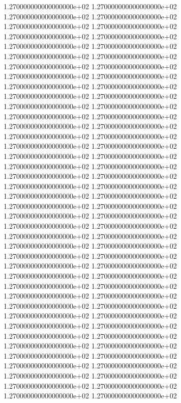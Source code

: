 1.270000000000000000e+02 1.270000000000000000e+02 1.270000000000000000e+02 1.270000000000000000e+02 1.270000000000000000e+02 1.270000000000000000e+02 1.270000000000000000e+02 1.270000000000000000e+02 1.270000000000000000e+02 1.270000000000000000e+02 1.270000000000000000e+02 1.270000000000000000e+02 1.270000000000000000e+02 1.270000000000000000e+02 1.270000000000000000e+02 1.270000000000000000e+02 1.270000000000000000e+02 1.270000000000000000e+02 1.270000000000000000e+02 1.270000000000000000e+02 1.270000000000000000e+02 1.270000000000000000e+02 1.270000000000000000e+02 1.270000000000000000e+02 1.270000000000000000e+02 1.270000000000000000e+02 1.270000000000000000e+02 1.270000000000000000e+02 1.270000000000000000e+02 1.270000000000000000e+02 1.270000000000000000e+02 1.270000000000000000e+02 1.270000000000000000e+02 1.270000000000000000e+02 1.270000000000000000e+02 1.270000000000000000e+02 1.270000000000000000e+02 1.270000000000000000e+02 1.270000000000000000e+02 1.270000000000000000e+02 1.270000000000000000e+02 1.270000000000000000e+02 1.270000000000000000e+02 1.270000000000000000e+02 1.270000000000000000e+02 1.270000000000000000e+02 1.270000000000000000e+02 1.270000000000000000e+02 1.270000000000000000e+02 1.270000000000000000e+02 1.270000000000000000e+02 1.270000000000000000e+02 1.270000000000000000e+02 1.270000000000000000e+02 1.270000000000000000e+02 1.270000000000000000e+02 1.270000000000000000e+02 1.270000000000000000e+02 1.270000000000000000e+02 1.270000000000000000e+02 1.270000000000000000e+02 1.270000000000000000e+02 1.270000000000000000e+02 1.270000000000000000e+02 1.270000000000000000e+02 1.270000000000000000e+02 1.270000000000000000e+02 1.270000000000000000e+02 1.270000000000000000e+02 1.270000000000000000e+02 1.270000000000000000e+02 1.270000000000000000e+02 1.270000000000000000e+02 1.270000000000000000e+02 1.270000000000000000e+02 1.270000000000000000e+02 1.270000000000000000e+02 1.270000000000000000e+02 1.270000000000000000e+02 1.270000000000000000e+02
